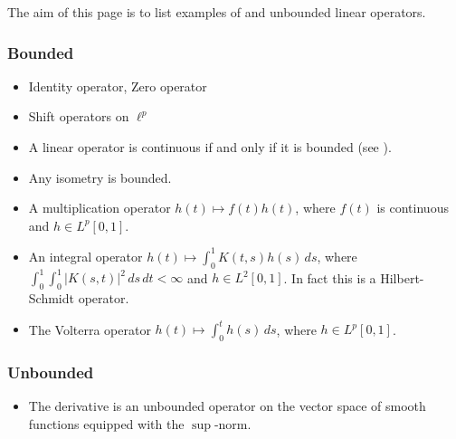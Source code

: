 \documentclass[12pt]{article}
\newcommand*{\abs}[1]{| #1 |}
\begin{document}
The aim of this page is to list examples of  and unbounded 
linear operators. 

\subsubsection*{Bounded}
\begin{itemize}
\item Identity operator, Zero operator
\item Shift operators on $\ell^p$
\item A linear operator is continuous if and only if 
   it is bounded (see ).
\item Any isometry is bounded.
\item A multiplication operator $h(t) \mapsto f(t) h(t)$, where $f(t)$
  is continuous and $h\in L^p[0,1]$.
\item An integral operator $h(t) \mapsto \int_0^1 K(t,s) h(s)\,ds$, where
  $\int_0^1\int_0^1 \abs{K(s,t)}^2\,ds\,dt < \infty$ and $h\in L^2[0,1]$.
  In fact this is a Hilbert-Schmidt operator.
\item The Volterra operator $h(t) \mapsto \int_0^t h(s)\,ds$, where
  $h\in L^p[0,1]$.
\end{itemize}

\subsubsection*{Unbounded}
\begin{itemize}
\item The derivative is an unbounded operator on the 
   vector space of smooth functions equipped with the 
   $\operatorname{sup}$-norm.
\end{itemize}
\end{document}
